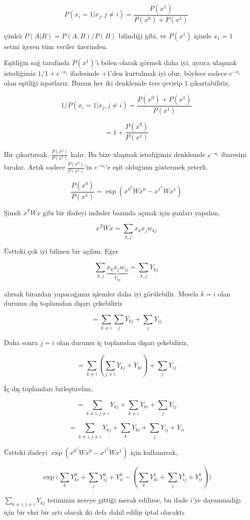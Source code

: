 \documentclass[12pt,fleqn]{article}\usepackage{../../common}
\begin{document}
$$  
P(x_i = 1 | x_j,j \ne i)  = \frac{P(x^1)}{P(x^0) + P(x^1)} 
$$

çünkü $P(A|B) = P(A,B) / P(B)$ bilindiği gibi, ve $P(x^1)$ içinde $x_1=1$
setini içeren tüm veriler üzerinden. 

Eşitliğin sağ tarafında $P(x^1)$'i bölen olarak görmek daha iyi, ayrıca
ulaşmak istediğimiz $1/1 + e^{-a_i}$ ifadesinde $+1$'den kurtulmak iyi
olur, böylece sadece $e^{-a_i}$ olan eşitliği ispatlarız. Bunun her iki
denklemde ters çevirip 1 çıkartabiliriz,

$$  
1 / P(x_i = 1 | x_j,j \ne i) = \frac{P(x^0) + P(x^1)}{P(x^1)} 
$$

$$
= 1 + \frac{ P(x^0)}{P(x^1)}
$$

Bir çıkartırsak, $\frac{ P(x^0)}{P(x^1)}$ kalır. Bu bize ulaşmak
istediğimiz denklemde $e^{-a_i}$ ibaresini bırakır. Artık sadece
$\frac{P(x^0)}{P(x^1)}$'in $e^{-a_i}$'e eşit olduğunu göstermek yeterli.


$$ 
\frac{ P(x^0)}{P(x^1)} = \exp( x^{0^T}Wx^0 -   x^{1^T}Wx^1 )
$$

Şimdi $x^TWx$ gibi bir ifadeyi indisler bazında açmak için şunları yapalım, 

$$ 
x^TWx = \sum_{k,j} x_kx_jw_{kj} 
$$

Üstteki çok iyi bilinen bir açılım. Eğer

$$ 
\sum_{k,j} \underbrace{x_kx_jw_{ij}}_{Y_{kj}} = \sum_{k,j}Y_{kj} 
$$

alırsak birazdan yapacağımız işlemler daha iyi görülebilir. Mesela $k=i$
olan durumu dış toplamdan dışarı çekebiliriz

$$ 
= \sum_{k \ne i}\sum_j Y_{kj} + \sum_{j} Y_{ij}
$$

Daha sonra $j = i$ olan durumu iç toplamdan dışarı çekebiliriz, 

$$ 
= \sum_{k \ne i}( \sum_{j \ne i} Y_{kj} + Y_{ki}) + \sum_{j} Y_{ij}
$$

İç dış toplamları birleştirelim,

$$ 
= \sum_{k \ne i,j \ne i} Y_{kj} + \sum_{k \ne i}  Y_{ki} + \sum_{j} Y_{ij}
$$

$$ 
= \sum_{k \ne i,j \ne i} Y_{kj} + \sum_{k}  Y_{ki} + \sum_{j} Y_{ij} + Y_{ii}
$$

Üstteki ifadeyi $\exp( x^{0^T}Wx^0 - x^{1^T}Wx^1 )$ için kullanırsak,

$$ 
\exp 
\big( 
\sum_{k}  Y_{ki}^0 + \sum_{j} Y_{ij}^0 + Y_{ii}^0 - 
( \sum_{k}  Y_{ki}^1 + \sum_{j} Y_{ij}^1 + Y_{ii}^1  )
\big)
$$

$\sum_{k \ne i,j \ne i} Y_{kj}$ teriminin nereye gittiği merak edilirse,
bu ifade $i$'ye dayanmadığı için bir eksi bir artı olarak iki defa dahil
edilip iptal olacaktı. 
\end{document}
